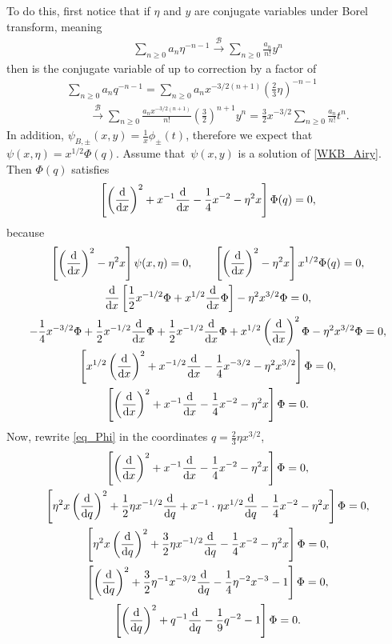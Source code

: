 \documentclass[10pt,a4paper]{amsart}
\newcommand{\borel}{\mathcal{B}}
\numberwithin{equation}{section}
\begin{document}
To do this, first notice that if $\eta$ and $y$ are conjugate variables under Borel transform, meaning
\begin{align*}
\sum_{n\geq 0}a_n\eta^{-n-1} \overset{\borel}{\longrightarrow} \sum_{n\geq 0}\frac{a_n}{n!} y^{n}
\end{align*}
then  is the conjugate variable of  up to correction by a factor of 
\begin{gather*}
\sum_{n\geq 0}a_nq^{-n-1}=\sum_{n\geq 0}a_nx^{-3/2(n+1)}\left(\frac{2}{3}\eta\right)^{-n-1}\\
\qquad \overset{\borel}{\longrightarrow} \sum_{n\geq 0}\frac{a_nx^{-3/2(n+1)}}{n!}\left(\frac{3}{2}\right)^{n+1} y^{n}=\frac{3}{2}x^{-3/2}\sum_{n\geq 0}\frac{a_n}{n!} t^{n}.
\end{gather*}
In addition, $\psi_{B,\pm}(x,y)=\frac{1}{x}\phi_{\pm}(t)$, therefore we expect that $\psi(x,\eta)=x^{1/2}\Phi(q)$. Assume that~$\psi(x,y)$ is a solution of \eqref{WKB_Airy}. Then $\Phi(q)$ satisfies
\begin{equation}
\label{eq_Phi}
\left[\left(\frac{\rm d}{{\rm d}x}\right)^2+x^{-1}\frac{\rm d}{{\rm d}x}-\frac{1}{4}x^{-2} - \eta^2 x \right] \Phi(q) = 0,
\end{equation}
because
\begin{gather*}
\left[\left(\frac{\rm d}{{\rm d}x}\right)^2 - \eta^2 x \right] \psi(x, \eta) = 0,\qquad
\left[\left(\frac{\rm d}{{\rm d}x}\right)^2 - \eta^2 x \right] x^{1/2}\Phi(q) = 0,\\
\frac{\rm d}{{\rm d}x}\left[\frac{1}{2}x^{-1/2}\Phi+x^{1/2}\frac{\rm d}{{\rm d}x}\Phi\right]-\eta^2x^{3/2}\Phi=0,\\
-\frac{1}{4}x^{-3/2}\Phi+\frac{1}{2}x^{-1/2}\frac{\rm d}{{\rm d}x}\Phi+\frac{1}{2}x^{-1/2}\frac{\rm d}{{\rm d}x}\Phi+x^{1/2}\left(\frac{\rm d}{{\rm d}x}\right)^2\Phi-\eta^2x^{3/2}\Phi=0,\\
\left[x^{1/2}\left(\frac{\rm d}{{\rm d}x}\right)^2+x^{-1/2}\frac{\rm d}{{\rm d}x}-\frac{1}{4}x^{-3/2}-\eta^2x^{3/2}\right]\Phi=0,\\
\left[\left(\frac{\rm d}{{\rm d}x}\right)^2+x^{-1}\frac{\rm d}{{\rm d}x}-\frac{1}{4}x^{-2}-\eta^2x\right]\Phi=0.
\end{gather*}
%
Now, rewrite \eqref{eq_Phi} in the coordinates $q=\frac{2}{3}\eta x^{3/2}$,
\begin{gather*}
\left[\left(\frac{\rm d}{{\rm d}x}\right)^2+x^{-1}\frac{\rm d}{{\rm d}x}-\frac{1}{4}x^{-2}-\eta^2x\right]\Phi=0,\\
\left[\eta^2x\left(\frac{\rm d}{{\rm d}q}\right)^2+\frac{1}{2}\eta x^{-1/2}\frac{\rm d}{{\rm d}q}+x^{-1}\cdot \eta x^{1/2}\frac{\rm d}{{\rm d}q}-\frac{1}{4}x^{-2}-\eta^2x\right]\Phi=0,\\
\left[\eta^2x\left(\frac{\rm d}{{\rm d}q}\right)^2+\frac{3}{2}\eta x^{-1/2}\frac{\rm d}{{\rm d}q}-\frac{1}{4}x^{-2}-\eta^2x\right]\Phi=0,\\
\left[\left(\frac{\rm d}{{\rm d}q}\right)^2+\frac{3}{2}\eta^{-1} x^{-3/2}\frac{\rm d}{{\rm d}q}-\frac{1}{4}\eta^{-2}x^{-3}-1\right]\Phi=0,\\
\left[\left(\frac{\rm d}{{\rm d}q}\right)^2+q^{-1}\frac{\rm d}{{\rm d}q}-\frac{1}{9}q^{-2}-1\right]\Phi=0.
\end{gather*}
\end{document}
